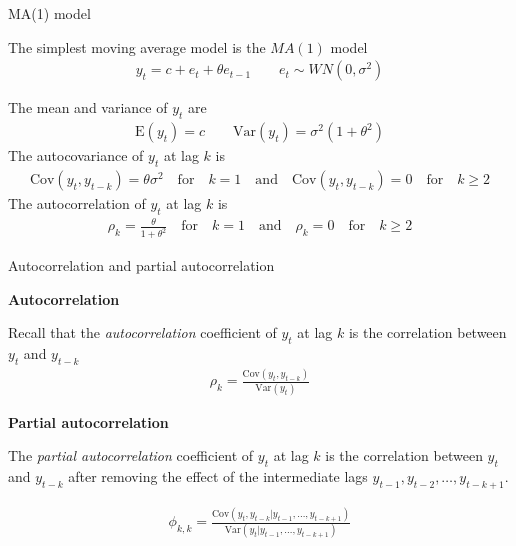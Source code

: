 \documentclass[10pt,aspectratio=169]{beamer}  %
\begin{document}

\begin{frame}{MA(1) model}

    \bigskip
    The simplest moving average model is the $ MA(1) $ model
    \begin{align*}
        y_{t} = c + e_{t} + \theta e_{t-1} \qquad e_{t} \sim WN(0, \sigma^2)
    \end{align*}

    \medskip
    The mean and variance of $ y_{t} $ are
    \begin{align*}
        \mathrm{E}(y_{t}) = c \qquad \mathrm{Var}(y_{t}) = \sigma^2 \left( 1 + \theta^2 \right)
    \end{align*}
    The autocovariance of $ y_{t} $ at lag $ k $ is
    \begin{align*}
        \mathrm{Cov}(y_{t}, y_{t-k}) = \theta \sigma^2 \quad \text{for} \quad k = 1 \quad \text{and} \quad \mathrm{Cov}(y_{t}, y_{t-k}) = 0 \quad \text{for} \quad k \geq 2
    \end{align*}
    The autocorrelation of $ y_{t} $ at lag $ k $ is
    \begin{align*}
        \rho_{k} = \frac{\theta}{1 + \theta^2} \quad \text{for} \quad k = 1 \quad \text{and} \quad \rho_{k} = 0 \quad \text{for} \quad k \geq 2
    \end{align*}

\end{frame}


\begin{frame}{Autocorrelation and partial autocorrelation}

    \bigskip
    \textbf{Autocorrelation}

    Recall that the \textit{autocorrelation} coefficient of $ y_{t} $ at lag $ k $ is the correlation between $ y_{t} $ and $ y_{t-k} $
    \begin{align*}
        \rho_{k} = \frac{\mathrm{Cov}(y_{t}, y_{t-k})}{\mathrm{Var}(y_{t})}
    \end{align*}

    \medskip
    \textbf{Partial autocorrelation}

    The \textit{partial autocorrelation} coefficient of $ y_{t} $ at lag $ k $ is the correlation between $ y_{t} $ and $ y_{t-k} $ after removing the effect of the intermediate lags $ y_{t-1}, y_{t-2}, \ldots, y_{t-k+1} $.

    \begin{align*}
        \phi_{k,k} = \frac{\mathrm{Cov}(y_{t}, y_{t-k} | y_{t-1}, \ldots, y_{t-k+1})}{\mathrm{Var}(y_{t} | y_{t-1}, \ldots, y_{t-k+1})}
    \end{align*}

\end{frame}
\end{document}
